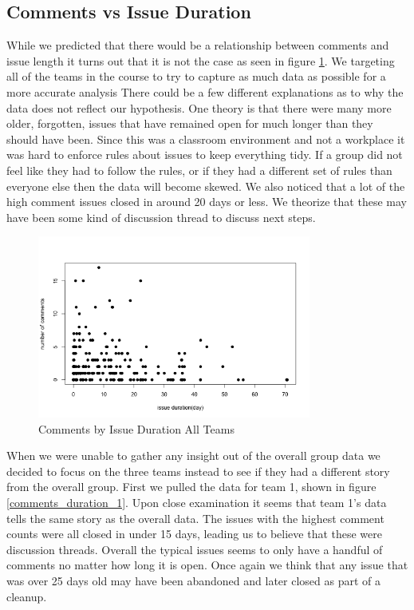 \documentclass[conference]{IEEEtran}
\begin{document}
\subsection{Comments vs Issue Duration}
While we predicted that there would be a relationship between comments and issue length it turns out that it is not the case as seen in figure \ref{comments_duration_all}. We targeting all of the teams in the course to try to capture as much data as possible for a more accurate analysis There could be a few different explanations as to why the data does not reflect our hypothesis. One theory is that there were many more older, forgotten, issues that have remained open for much longer than they should have been. Since this was a classroom environment and not a workplace it was hard to enforce rules about issues to keep everything tidy. If a group did not feel like they had to follow the rules, or if they had a different set of rules than everyone else then the data will become skewed. We also noticed that a lot of the high comment issues closed in around 20 days or less. We theorize that these may have been some kind of discussion thread to discuss next steps. 
\begin{figure}[H]
    \centering
    \includegraphics[width=9cm]{../AprilProject/pic/comments_and_issue_duration_all.png}
    \caption{Comments by Issue Duration All Teams}
    \label{comments_duration_all}
\end{figure}

When we were unable to gather any insight out of the overall group data we decided to focus on the three teams instead to see if they had a different story from the overall group. First we pulled the data for team 1, shown in figure \ref{comments_duration_1}. Upon close examination it seems that team 1's data tells the same story as the overall data. The issues with the highest comment counts were all closed in under 15 days, leading us to believe that these were discussion threads. Overall the typical issues seems to only have a handful of comments no matter how long it is open. Once again we think that any issue that was over 25 days old may have been abandoned and later closed as part of a cleanup. 
\end{document}
